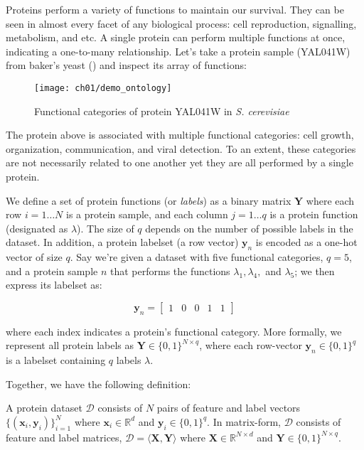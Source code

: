 \par Proteins perform a variety of functions to maintain our survival. They
can be seen in almost every facet of any biological process: cell
reproduction, signalling, metabolism, and etc. A single protein can perform
multiple functions at once, indicating a one-to-many relationship. Let's take
a protein sample (YAL041W) from baker's yeast (\cite{elisseeff2001kernel})
and inspect its array of functions:

\begin{figure}[!h]
  \centering
  \texttt{[image: ch01/demo\_ontology]}
  \caption{Functional categories of protein YAL041W in \textit{S. cerevisiae}}
  \label{demo:yeast_go}
\end{figure}

\noindent The protein above is associated with multiple functional
categories: cell growth, organization, communication, and viral detection. To
an extent, these categories are not necessarily related to one another yet
they are all performed by a single protein.

\par We define a set of protein functions (or \textit{labels}) as a binary
matrix $\mathbf{Y}$ where each row $i=1 \dots N$ is a protein sample, and
each column $j=1 \dots q$ is a protein function (designated as $\lambda$).
The size of $q$ depends on the number of possible labels in the dataset. In
addition, a protein labelset (a row vector) $\mathbf{y}_n$ is encoded as a
one-hot vector of size $q$. Say we're given a dataset with five functional
categories, $q=5$, and a protein sample $n$ that performs the functions
$\lambda_1, \lambda_4,$ and $\lambda_5$; we then express its labelset as:

\[
    \mathbf{y}_n = \left[\begin{matrix}
        1 & 0 & 0 & 1 & 1
    \end{matrix} \right]
\]

\noindent where each index indicates a protein's functional category. More formally, we
represent all protein labels as $\mathbf{Y} \in \{0,1\}^{N \times q}$, where each
row-vector $\mathbf{y}_n \in \{0,1\}^q$ is a labelset containing $q$ labels
$\lambda$.


\newpage
Together, we have the following definition:

\begin{definition}{}
A protein dataset $\mathcal{D}$ consists of $N$ pairs of feature and label
vectors $\{(\mathbf{x}_i, \mathbf{y}_i)\}_{i=1}^{N}$ where $\mathbf{x}_i \in
\mathbb{R}^d$ and $\mathbf{y}_i \in \{0,1\}^q$. In matrix-form, $\mathcal{D}$
consists of feature and label matrices, $\mathcal{D} = \langle \mathbf{X},
\mathbf{Y} \rangle$ where $\mathbf{X} \in \mathbb{R}^{N \times d}$ and
$\mathbf{Y} \in \{0,1\}^{N \times q}$.
\end{definition}


